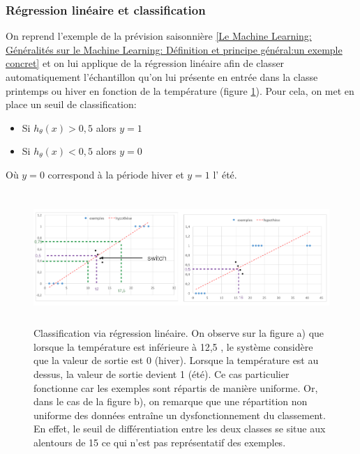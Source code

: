 \subsubsection{Régression linéaire et classification}
\label{Le Machine Learning: Les différents algorithmes: La regression logistique: Régression linéaire et classification}
On reprend l'exemple de la prévision saisonnière \ref{Le Machine Learning: Généralités sur le Machine Learning: Définition et principe général:un exemple concret} et on lui applique de la régression linéaire afin de classer automatiquement l'échantillon qu'on lui présente en entrée dans la classe printemps ou hiver en fonction de la température (figure \ref{fig:Classification via regression linéaire}). 
Pour cela, on met en place un seuil de classification:
\begin{itemize}
	\item Si $h_\theta(x) > 0,5$ alors $y=1$
	\item Si $h_\theta(x) < 0,5$ alors $y=0$
\end{itemize}

Où $y = 0$ correspond à la période hiver et $y = 1$ l' été. 

\begin{figure}[h]
	\centering\includegraphics[height=5cm]{images/class_reg_lineaire.png}
	\caption[Classification via regression linéaire]{Classification via régression linéaire. On observe sur la figure a) que lorsque la température est inférieure à 12,5 \degres, le système considère que la valeur de sortie est 0 (hiver). Lorsque la température est au dessus, la valeur de sortie devient 1 (été). Ce cas particulier fonctionne car les exemples sont répartis de manière uniforme. Or, dans le cas de la figure b), on remarque que une répartition non uniforme des données entraîne un dysfonctionnement du classement. En effet, le seuil de différentiation entre les deux classes se situe aux alentours de  15 \degres ce qui n'est pas représentatif des exemples.}
	\label{fig:Classification via regression linéaire}
\end{figure}

